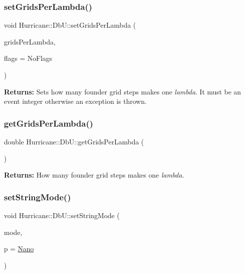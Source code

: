 \subsubsection{\texorpdfstring{set\+Grids\+Per\+Lambda()}{setGridsPerLambda()}}
{\footnotesize\ttfamily void Hurricane\+::\+Db\+U\+::set\+Grids\+Per\+Lambda (\begin{DoxyParamCaption}\item[{double}]{grids\+Per\+Lambda,  }\item[{unsigned int}]{flags = {\ttfamily NoFlags} }\end{DoxyParamCaption})\hspace{0.3cm}{\ttfamily [static]}}

{\bfseries Returns\+:} Sets how many founder grid steps makes one {\itshape lambda}. It must be an event integer otherwise an exception is thrown. \mbox{\label{group__DbUGroup_ga9a0359adbfafc356326f5c6adf57ff04}} 
\subsubsection{\texorpdfstring{get\+Grids\+Per\+Lambda()}{getGridsPerLambda()}}
{\footnotesize\ttfamily double Hurricane\+::\+Db\+U\+::get\+Grids\+Per\+Lambda (\begin{DoxyParamCaption}{ }\end{DoxyParamCaption})\hspace{0.3cm}{\ttfamily [static]}}

{\bfseries Returns\+:} How many founder grid steps makes one {\itshape lambda}. \mbox{\label{group__DbUGroup_ga89ab8f8326c54113336086663ecf1d25}} 
\subsubsection{\texorpdfstring{set\+String\+Mode()}{setStringMode()}}
{\footnotesize\ttfamily void Hurricane\+::\+Db\+U\+::set\+String\+Mode (\begin{DoxyParamCaption}\item[{unsigned int}]{mode,  }\item[{\hyperlink{group__DbUGroup_ga50b5785bf4d75026c4c112caec3040a7}{Unit\+Power}}]{p = {\ttfamily \hyperlink{group__DbUGroup_gga50b5785bf4d75026c4c112caec3040a7a03e5923be5810db830626f2ca26319d6}{Nano}} }\end{DoxyParamCaption})\hspace{0.3cm}{\ttfamily [static]}}

